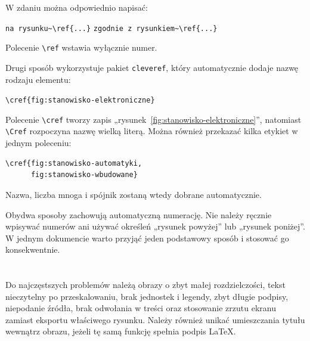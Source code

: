 W zdaniu można odpowiednio napisać:

\begin{center}
\verb|na rysunku~\ref{...}|
\qquad
\verb|zgodnie z rysunkiem~\ref{...}|
\end{center}

Polecenie \verb|\ref| wstawia wyłącznie numer.

Drugi sposób wykorzystuje pakiet \texttt{cleveref}, który automatycznie dodaje nazwę rodzaju elementu:

\begin{center}
\verb|\cref{fig:stanowisko-elektroniczne}|
\end{center}

Polecenie \verb|\cref| tworzy zapis „rysunek~\ref{fig:stanowisko-elektroniczne}”, natomiast \verb|\Cref| rozpoczyna nazwę wielką literą. Można również przekazać kilka etykiet w jednym poleceniu:

\begin{lstlisting}[numbers=none]
\cref{fig:stanowisko-automatyki,
      fig:stanowisko-wbudowane}
\end{lstlisting}

Nazwa, liczba mnoga i spójnik zostaną wtedy dobrane automatycznie.

Obydwa sposoby zachowują automatyczną numerację. Nie należy ręcznie wpisywać numerów ani używać określeń „rysunek powyżej” lub „rysunek poniżej”. W jednym dokumencie warto przyjąć jeden podstawowy sposób i stosować go konsekwentnie.

\section{}

Do najczęstszych problemów należą obrazy o zbyt małej rozdzielczości, tekst nieczytelny po przeskalowaniu, brak jednostek i legendy, zbyt długie podpisy, niepodanie źródła, brak odwołania w treści oraz stosowanie zrzutu ekranu zamiast eksportu właściwego rysunku. Należy również unikać umieszczania tytułu wewnątrz obrazu, jeżeli tę samą funkcję spełnia podpis LaTeX.
